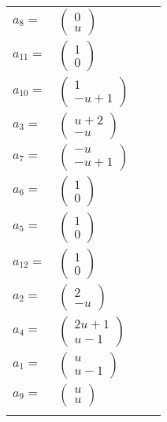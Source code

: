 \documentclass[1p]{elsarticle_modified}
\theoremstyle{definition}
\begin{document}
\begin{tabular}{m{7pt} m{180pt} m{7pt} m{180pt} }
\flushright $a_{8}=$&$\begin{pmatrix}0\\u\end{pmatrix}$ \\
\flushright $a_{11}=$&$\begin{pmatrix}1\\0\end{pmatrix}$ \\
\flushright $a_{10}=$&$\begin{pmatrix}1\\- u+1\end{pmatrix}$ \\
\flushright $a_{3}=$&$\begin{pmatrix}u+2\\- u\end{pmatrix}$ \\
\flushright $a_{7}=$&$\begin{pmatrix}- u\\- u+1\end{pmatrix}$ \\
\flushright $a_{6}=$&$\begin{pmatrix}1\\0\end{pmatrix}$ \\
\flushright $a_{5}=$&$\begin{pmatrix}1\\0\end{pmatrix}$ \\
\flushright $a_{12}=$&$\begin{pmatrix}1\\0\end{pmatrix}$ \\
\flushright $a_{2}=$&$\begin{pmatrix}2\\- u\end{pmatrix}$ \\
\flushright $a_{4}=$&$\begin{pmatrix}2 u+1\\u-1\end{pmatrix}$ \\
\flushright $a_{1}=$&$\begin{pmatrix}u\\u-1\end{pmatrix}$ \\
\flushright $a_{9}=$&$\begin{pmatrix}u\\u\end{pmatrix}$\\&\end{tabular}
\end{document}

